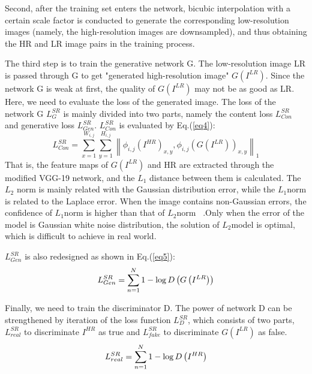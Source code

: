 \documentclass[10pt,twocolumn,letterpaper]{article}
\begin{document}
Second, after the training set enters the network, bicubic interpolation with a certain scale factor is conducted to generate the corresponding low-resolution images (namely, the high-resolution images are downsampled), and thus obtaining the HR and LR image pairs in the training process.

The third step is to train the generative network G. The low-resolution image LR is passed through G to get "generated high-resolution image" $G{\left(I^{L R}\right)}$. Since the network G is weak at first, the quality of $G{\left(I^{L R}\right)}$ may not be as good as LR. Here, we need to evaluate the loss of the generated image. The loss of the network G $L_{G}^{SR}$ is mainly divided into two parts, namely the content loss $L_{Con}^{SR} $ and generative loss $L_{Gen} ^{SR}$. $L_{Con}^{SR}$ is evaluated by Eq.(\ref{eq4}):
\begin{equation}\label{eq4}
L_{Con}^{SR} = \sum\limits_{x = 1}^{{W_{i,j}}} {\sum\limits_{y = 1}^{{H_{i,j}}} {{{\left\| {{\phi _{i,j}}{{\left( {{I^{HR}}} \right)}_{x,y}},{\phi _{i,j}}{{\left( {G\left( {{I^{LR}}} \right)} \right)}_{x,y}}} \right\|}_1}} } 
\end{equation} 
That is, the feature maps of $G{\left(I^{LR}\right)}$ and HR are extracted through the modified VGG-19 network, and the $L_1$ distance between them is calculated. The $L_2$ norm is mainly related with the Gaussian distribution error, while the $L_1$norm is related to the Laplace error. When the image contains non-Gaussian errors, the confidence of $L_1$norm is higher than that of $L_2$norm~\cite{song2010adaptive} .Only when the error of the model is Gaussian white noise distribution, the solution of $L_2$model is optimal, which is difficult to achieve in real world. 

$L_{Gen}^{SR}$ is also redesigned as shown in Eq.(\ref{eq5}):
\begin{equation}\label{eq5}
L_{Gen}^{SR} = \sum\limits_{n = 1}^N {{\rm{1}} - \log D\left( {G\left( {{I^{LR}}} \right)} \right)} 
\end{equation}

Finally, we need to train the discriminator D. The power of network D can be strengthened by iteration of the loss function $L_{D}^{SR}$, which consists of two parts,  $L_{real}^{SR}$ to discriminate $I^{HR}$ as true and $L_{fake}^{SR}$ to discriminate $G{\left(I^{L R}\right)}$ as false.
\begin{equation}\label{eq7}
L_{real}^{SR} = \sum\limits_{n = 1}^N {{\rm{1}} - \log D\left( {{I^{HR}}} \right)}
\end{equation}
\end{document}
